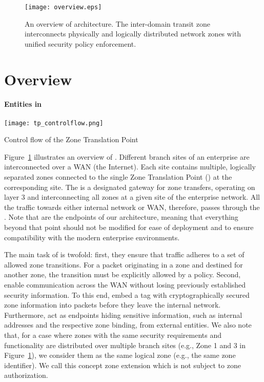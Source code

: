 \begin{figure}[htb]
	\begin{center}
		\texttt{[image: overview.eps]}
	\end{center}
	\caption{An overview of \name architecture. The inter-domain transit zone interconnects physically
	and logically distributed network zones with unified security policy enforcement.}
	\label{fig:overview}
\end{figure}

\section{\name Overview}
\label{sec:overview}

\paragraph{Entities in \name}

\begin{floatingfigure}[r]{0.5\textwidth}
	\centering
	\texttt{[image: tp\_controlflow.png]}
	\caption{Control flow of the Zone Translation Point}
	\label{archi:flow}
\end{floatingfigure}

Figure~\ref{fig:overview} illustrates an overview of \name.
Different branch sites of an enterprise are interconnected over a WAN (\eg the Internet). Each site
contains multiple, logically separated zones connected to the single Zone
Translation Point (\tp) at the corresponding site. The \tp is a designated gateway
for zone transfers, operating on layer 3 and interconnecting all zones at a given
site of the enterprise network. All the traffic towards either internal network or
WAN, therefore, passes through the \tp. Note that \tps are the endpoints
of our architecture, meaning that everything beyond that point should not be
modified for ease of deployment and to ensure compatibility with the modern enterprise
environments.

The main task of \tps is twofold:
first, they ensure that traffic adheres to a set of allowed zone transitions. For
a packet originating in a zone and destined for another zone, the transition must be
explicitly allowed by a policy. Second, \tps enable communication across the WAN without
losing previously established security information. To this end, \tps embed a tag
with cryptographically secured zone information into packets before they leave the
internal network. Furthermore, \tps act as endpoints hiding sensitive information,
such as internal addresses and the respective zone binding, from external entities.
We also note that, for a case where zones with the same security requirements and
functionality are distributed over multiple branch sites (e.g., Zone 1 and 3 in
Figure~\ref{fig:overview}),
we consider them as the same logical zone (e.g., the same zone identifier). We call
this concept zone extension which is not subject to zone authorization.

